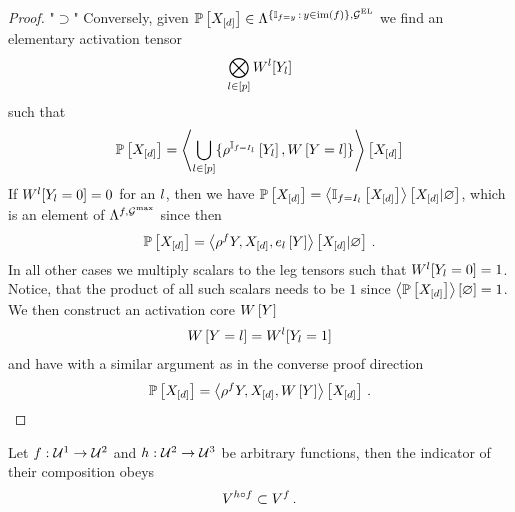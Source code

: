 \begin{proof}
    "$\supset$"
    Conversely, given $\mathbb{P}\left[X_{[d]}\right]\in\Lambda^{\{\mathbb{I}_{f=y}\,:\,y\in\mathrm{im}\left(f\right)\},\mathcal{G}^{\mathrm{EL}}}$ we find an elementary activation tensor
    \begin{align*}
        \bigotimes_{l\in[p]}W^{l}[Y_{l}]
    \end{align*}
    such that
    \begin{align*}
        \mathbb{P}\left[X_{[d]}\right] = \left\langle \bigcup_{l\in[p]}\{\rho^{\mathbb{I}_{f=I_{l}}}\left[Y_{l}\right],W\left[Y=l\right]\}\right\rangle \left[ X_{[d]} \right]
    \end{align*}
    If $W^{l}[Y_{l}=0]=0$ for an $l$, then we have $\mathbb{P}\left[X_{[d]}\right]=\left\langle \mathbb{I}_{f=I_{l}}\left[X_{[d]}\right]\right\rangle \left[ X_{[d]} | \varnothing \right]$, which is an element of $\Lambda^{f,\mathcal{G}^{\mathrm{max}}}$ since then
    \begin{align*}
        \mathbb{P}\left[X_{[d]}\right] = \left\langle \rho^{f}{Y,X_{[d]}},e_{l}\left[Y\right]\right\rangle \left[ X_{[d]} | \varnothing \right] \, .
    \end{align*}
    In all other cases we multiply scalars to the leg tensors such that $W^{l}[Y_{l}=0]=1$.
    Notice, that the product of all such scalars needs to be $1$ since $\left\langle \mathbb{P}\left[X_{[d]}\right]\right\rangle \left[ \varnothing \right]=1$.
    We then construct an activation core $W\left[Y\right]$
    \begin{align*}
        W\left[Y=l\right] = W^{l}[Y_{l}=1]
    \end{align*}
    and have with a similar argument as in the converse proof direction
    \begin{align*}
        \mathbb{P}\left[X_{[d]}\right] = \left\langle \rho^{f}{Y,X_{[d]}},W\left[Y\right]\right\rangle \left[ X_{[d]} \right] \, .
    \end{align*}
\end{proof}



Let $f: \mathcal{U}^{1}\rightarrow\mathcal{U}^{2}$ and $h:\mathcal{U}^{2}\rightarrow\mathcal{U}^{3}$ be arbitrary functions, then the indicator of their composition obeys
\begin{align*}
    V^{h\circ f} \subset V^{f} \, .
\end{align*}


